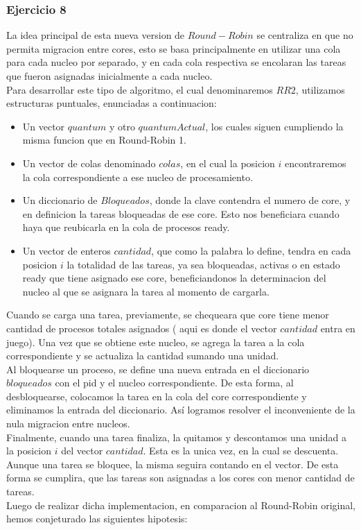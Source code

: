 \subsubsection[Resolución Ejercicio 8]{Ejercicio 8}
La idea principal de esta nueva version de $Round-Robin$ se centraliza en que no permita migracion entre
cores, esto se basa principalmente en utilizar una cola para cada nucleo por separado, y en cada
cola respectiva se encolaran las tareas que fueron asignadas inicialmente a cada nucleo.\\
Para desarrollar este tipo de algoritmo, el cual denominaremos $RR2$, utilizamos estructuras
puntuales, enunciadas a continuacion:\\
\begin{itemize}
 \item Un vector $quantum$ y otro $quantumActual$, los cuales siguen cumpliendo la misma funcion que
 en Round-Robin 1.
 \item Un vector de colas denominado $colas$, en el cual la posicion $i$ encontraremos la cola correspondiente
 a ese nucleo de procesamiento.
 \item Un diccionario de $Bloqueados$, donde la clave contendra el numero de core, y en definicion
 la tareas bloqueadas de ese core. Esto nos beneficiara cuando haya que reubicarla en la cola de procesos ready.
 \item Un vector de enteros $cantidad$, que como la palabra lo define, tendra en cada posicion $i$ 
 la totalidad de las tareas, ya sea bloqueadas, activas o en estado ready que tiene asignado ese core, beneficiandonos
 la determinacion del nucleo al que se asignara la tarea al momento de cargarla.
\end{itemize}
Cuando se carga una tarea, previamente, se chequeara que core tiene menor cantidad de procesos totales asignados (
aqui es donde el vector $cantidad$ entra en juego). Una vez que se obtiene este nucleo, se agrega 
la tarea a la cola correspondiente y se actualiza la cantidad sumando una unidad.\\
\indent Al bloquearse un proceso, se define una nueva entrada en el diccionario $bloqueados$ con el
pid y el nucleo correspondiente. De esta forma, al desbloquearse, colocamos la tarea en la cola del core
correspondiente y eliminamos la entrada del diccionario. Así logramos resolver el inconveniente de la nula
migracion entre nucleos.\\
\indent Finalmente, cuando una tarea finaliza, la quitamos y descontamos una unidad a la posicion $i$ del vector
$cantidad$. Esta es la unica vez, en la cual se descuenta. Aunque una tarea se bloquee, la misma
seguira contando en el vector. De esta forma se cumplira, que las tareas son asignadas a los cores
con menor cantidad de tareas.\\
Luego de realizar dicha implementacion, en comparacion al Round-Robin original, hemos conjeturado 
las siguientes hipotesis:

